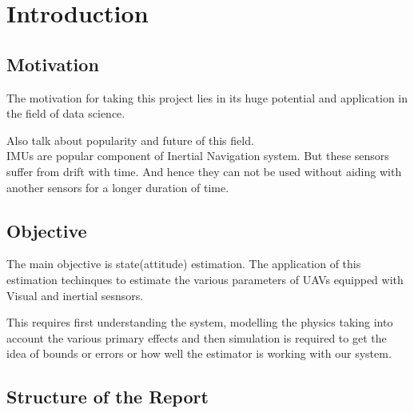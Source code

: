 
\chapter{Introduction} %

\label{Chapter1} %


\newcommand{\keyword}[1]{\textbf{#1}}
\newcommand{\tabhead}[1]{\textbf{#1}}
\newcommand{\code}[1]{\texttt{#1}}
\newcommand{\file}[1]{\texttt{\bfseries#1}}
\newcommand{\option}[1]{\texttt{\itshape#1}}


\section{Motivation}
The motivation for taking this project lies in its huge potential and application in the field of data science.

Also talk about popularity and future of this field.\\
IMUs are popular component of Inertial Navigation system. But these sensors suffer from drift with time. And hence they can not be used without aiding with another sensors for a longer duration of time.


\section{Objective}

The main objective is state(attitude) estimation. The application of this estimation techinques to estimate the various parameters of UAVs equipped with Visual and inertial sesnsors.

This requires first understanding the system, modelling the physics taking into account the various primary effects and then simulation is required to get the idea of bounds or errors or how well the estimator is working with our system.
\section{Structure of the Report}

